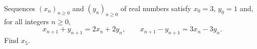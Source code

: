 Sequences $(x_n)_{n\ge0}$ and $(y_n)_{n\ge0}$ of real numbers satisfy $x_0=3$, $y_0=1$ and, for all integers $n\ge0$,
\[x_{n+1}+y_{n+1}=2x_n+2y_n,\qquad x_{n+1}-y_{n+1}=3x_n-3y_n.\]
Find $x_5$.
